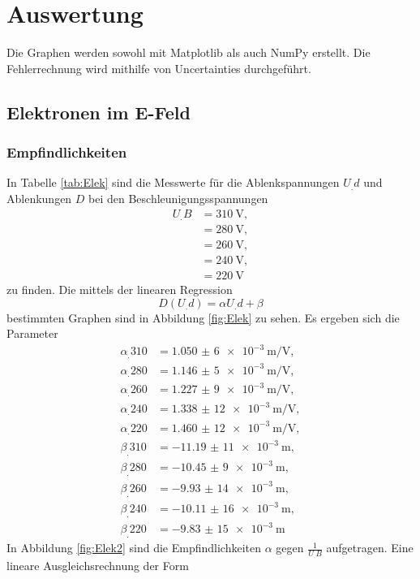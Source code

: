 \section{Auswertung}
\label{sec:Auswertung}


Die Graphen werden sowohl mit Matplotlib \cite{matplotlib} als auch NumPy \cite{numpy} erstellt. Die Fehlerrechnung wird mithilfe von Uncertainties \cite{uncertainties} durchgeführt.

\subsection{Elektronen im E-Feld}
\subsubsection{Empfindlichkeiten}
\label{sec:empf}
In Tabelle \ref{tab:Elek} sind die Messwerte für die Ablenkspannungen $U_.d$ und Ablenkungen $D$ bei den Beschleunigungsspannungen
\begin{align*}
U_.B&=\SI{310}{\volt},\\
&=\SI{280}{\volt},\\
&=\SI{260}{\volt},\\
&=\SI{240}{\volt},\\
&=\SI{220}{\volt}
\end{align*}
zu finden. Die mittels der linearen Regression \[D(U_.d)=\alpha U_.d + \beta\] bestimmten Graphen sind in Abbildung \ref{fig:Elek} zu sehen.
Es ergeben sich die Parameter
\begin{align*}
\alpha_.{310}&=\SI{1,050(6)e-3}{\metre\per\volt},\\
\alpha_.{280}&=\SI{1,146(5)e-3}{\metre\per\volt},\\
\alpha_.{260}&=\SI{1,227(9)e-3}{\metre\per\volt},\\
\alpha_.{240}&=\SI{1,338(12)e-3}{\metre\per\volt},\\
\alpha_.{220}&=\SI{1,460(12)e-3}{\metre\per\volt},\\
\beta_.{310}&=\SI{-11,19(11)e-3}{\metre},\\
\beta_.{280}&=\SI{-10,45(9)e-3}{\metre},\\
\beta_.{260}&=\SI{-9,93(14)e-3}{\metre},\\
\beta_.{240}&=\SI{-10,11(16)e-3}{\metre},\\
\beta_.{220}&=\SI{-9,83(15)e-3}{\metre}
\end{align*}
In Abbildung \ref{fig:Elek2} sind die Empfindlichkeiten $\alpha$ gegen $\frac{1}{U_.B}$ aufgetragen.
Eine lineare Ausgleichsrechnung der Form
